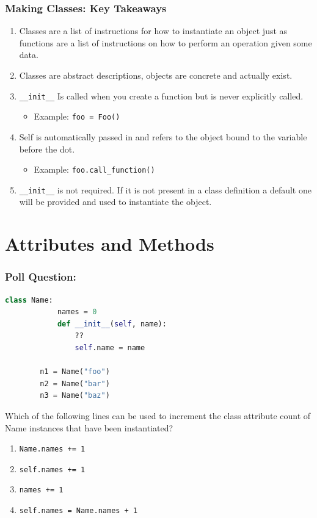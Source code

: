 \documentclass{beamer}
\begin{document}
%
%
\begin{frame}[fragile]
	\frametitle{Making Classes: Key Takeaways}

	\begin{enumerate}
		\item Classes are a list of instructions for how to instantiate an object just as functions are a list of instructions on how to perform an operation given some data.
		\item Classes are abstract descriptions, objects are concrete and actually exist.
		\item \lstinline|__init__| Is called when you create a function but is never explicitly called.
			\begin{itemize}
				\item Example: \lstinline|foo = Foo()|
			\end{itemize}
		\item Self is automatically passed in and refers to the object bound to the variable before the dot.
			\begin{itemize}
				\item Example: \lstinline|foo.call_function()|
			\end{itemize}
		\item \lstinline|__init__| is not required. If it is not present in a class definition a default one will be provided and used to instantiate the object.
	\end{enumerate}

\end{frame}

\section{Attributes and Methods}

%
%
%
\begin{frame}[fragile]
	\frametitle{Poll Question: }
	\begin{minipage}{0.49\textwidth}
		\begin{lstlisting}[language=Python, autogobble]
		class Name:
			names = 0
			def __init__(self, name):
				??
				self.name = name

		n1 = Name("foo")
		n2 = Name("bar")
		n3 = Name("baz")
		\end{lstlisting}
	\end{minipage}
	\hfill
	\begin{minipage}{0.49\textwidth}
		Which of the following lines can be used to increment the class attribute count of Name instances that have been instantiated?
		\begin{enumerate}[A]
			\item \lstinline|Name.names += 1|
			\item \lstinline|self.names += 1|
			\item \lstinline|names += 1|
			\item \lstinline|self.names = Name.names + 1|
		\end{enumerate}
	\end{minipage}
\end{frame}
\end{document}
